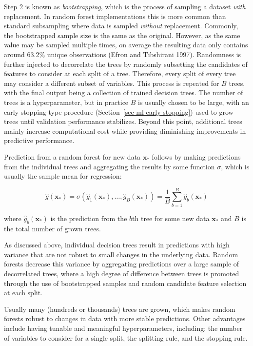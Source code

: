 \documentclass[
  letterpaper,
  krantz2]{style/krantz}
\begin{document}
Step 2 is known as \emph{bootstrapping}, which is the process of
sampling a dataset \emph{with} replacement. In
random forest implementations this is more common than standard
subsampling where data is sampled \emph{without} replacement. Commonly,
the bootstrapped sample size is the same as the original. However, as
the same value may be sampled multiple times, on average the resulting
data only contains around 63.2\% unique observations (Efron and
Tibshirani 1997). Randomness is further injected to decorrelate the
trees by randomly subsetting the candidates of features to consider at
each split of a tree. Therefore, every split of every tree may consider
a different subset of variables.
This process is repeated for \(B\) trees, with the final output being a
collection of trained decision trees. The number of trees is a
hyperparameter, but in
practice \(B\) is
usually chosen to be large, with an early stopping-type procedure
(Section~\ref{sec-ml-early-stopping}) used to grow trees until
validation performance stabilizes. Beyond this
point, additional trees mainly increase computational cost while
providing diminishing improvements in predictive performance.

Prediction from a random forest for new data \(\mathbf{x}_*\) follows by
making predictions from the individual trees and aggregating the results
by some function \(\sigma\), which is usually the sample mean for
regression:

\[
\hat{g}(\mathbf{x}_*) = \sigma(\hat{g}_1(\mathbf{x}_*),\ldots,\hat{g}_B(\mathbf{x}_*)) = \frac{1}{B} \sum^B_{b=1} \hat{g}_b(\mathbf{x}_*)
\]

where \(\hat{g}_b(\mathbf{x}_*)\) is the prediction from the \(b\)th
tree for some new data \(\mathbf{x}_*\) and \(B\) is the total number of
grown trees.

As discussed above, individual decision trees result in predictions with
high variance that are not robust to small changes in the underlying
data. Random forests decrease this variance by aggregating predictions
over a large sample of decorrelated trees, where a high degree of
difference between trees is promoted through the use of bootstrapped
samples and random candidate feature selection at each split.

Usually many (hundreds or thousands) trees are grown, which makes random
forests robust to changes in data with more stable predictions. Other
advantages include having tunable and meaningful hyperparameters,
including: the number of variables to consider for a single split, the
splitting rule, and the stopping rule.
\end{document}
